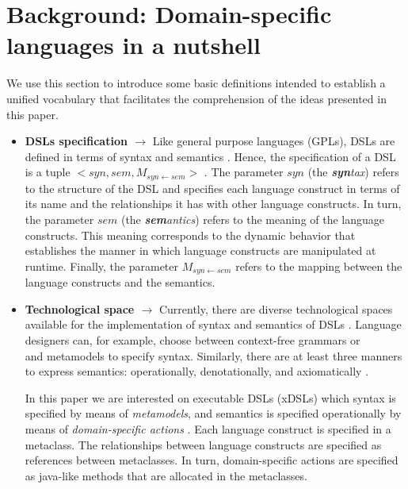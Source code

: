 \section{Background: Domain-specific languages in a nutshell}
\label{sec:background}
 
We use this section to introduce some basic definitions intended to establish a unified vocabulary that facilitates the comprehension of the ideas presented in this paper. 
 
\begin{itemize}


\item{\textbf{DSLs specification $\rightarrow$}} Like general purpose languages (GPLs), DSLs are defined in terms of syntax and semantics \cite{Harel:2004b}. Hence, the specification of a DSL is a tuple $<syn,sem,M_{syn\leftarrow sem}>$ \cite{Combemale:2013}. The parameter $syn$ (the \textit{\textbf{syn}tax}) refers to the structure of the DSL and specifies each language construct in terms of its name and the relationships it has with other language constructs. In turn, the parameter $sem$ (the \textit{\textbf{sem}antics}) refers to the meaning of the language constructs. This meaning corresponds to the dynamic behavior that establishes the manner in which language constructs are manipulated at runtime. Finally, the parameter $M_{syn\leftarrow sem}$ refers to the mapping between the language constructs and the semantics. 

\vspace{2mm}

\item{\textbf{Technological space $\rightarrow$}} Currently, there are diverse technological spaces available for the implementation of syntax and semantics of DSLs \cite{Mernik:2005b}. Language designers can, for example, choose between context-free grammars or\\and metamodels to specify syntax. Similarly, there are at least three manners to express semantics: operationally, denotationally, and axiomatically \cite{Mosses:2001}.

\hspace{3mm} In this paper we are interested on executable DSLs (xDSLs) which syntax is specified by means of \textit{metamodels}, and semantics is specified operationally by means of \textit{domain-specific actions} \cite{Combemale:2013}. Each language construct is specified in a metaclass. The relationships between language constructs are specified as references between metaclasses. In turn, domain-specific actions are specified as java-like methods that are allocated in the metaclasses.
 

\end{itemize}
